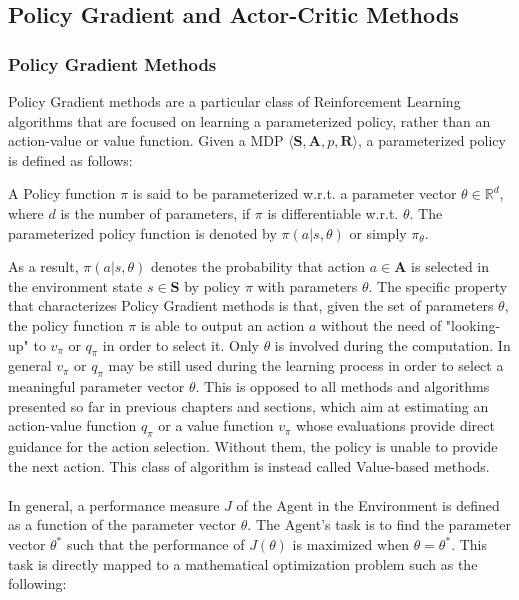         \subsection{Policy Gradient and Actor-Critic Methods}
        \label{subs:policygrad_actorcritic}
            \subsubsection{Policy Gradient Methods}
                Policy Gradient methods are a particular class of Reinforcement Learning algorithms that are focused on learning a parameterized policy, rather than an action-value or value function. Given a MDP $\langle \mathbf{S}, \mathbf{A}, p, \mathbf{R}\rangle$, a parameterized policy is defined as follows:
                
                \begin{definition}
                    \label{def:parameterizedpi}
                    A Policy function $\pi$ is said to be parameterized w.r.t. a parameter vector $\theta \in \mathbb{R}^d$, where $d$ is the number of parameters, if $\pi$ is differentiable w.r.t. $\theta$. The parameterized policy function is denoted by $\pi(a|s, \theta)$ or simply $\pi_\theta$.
                \end{definition}
                
                As a result, $\pi(a|s, \theta)$ denotes the probability that action $a \in \mathbf{A}$ is selected in the environment state $s \in \mathbf{S}$ by policy $\pi$ with parameters $\theta$. The specific property that characterizes Policy Gradient methods is that, given the set of parameters $\theta$, the policy function $\pi$ is able to output an action $a$ without the need of "looking-up" to $v_\pi$ or $q_\pi$ in order to select it. Only $\theta$ is involved during the computation. In general $v_\pi$ or $q_\pi$ may be still used during the learning process in order to select a meaningful parameter vector $\theta$. \newline
                This is opposed to all methods and algorithms presented so far in previous chapters and sections, which aim at estimating an action-value function $q_\pi$ or a value function $v_\pi$ whose evaluations provide direct guidance for the action selection. Without them, the policy is unable to provide the next action. This class of algorithm is instead called Value-based methods.
                \\\\
                In general, a performance measure $J$ of the Agent in the Environment is defined as a function of the parameter vector $\theta$. The Agent's task is to find the parameter vector $\theta^*$ such that the performance of $J(\theta)$ is maximized when $\theta = \theta^*$. This task is directly mapped to a mathematical optimization problem such as the following:
                
